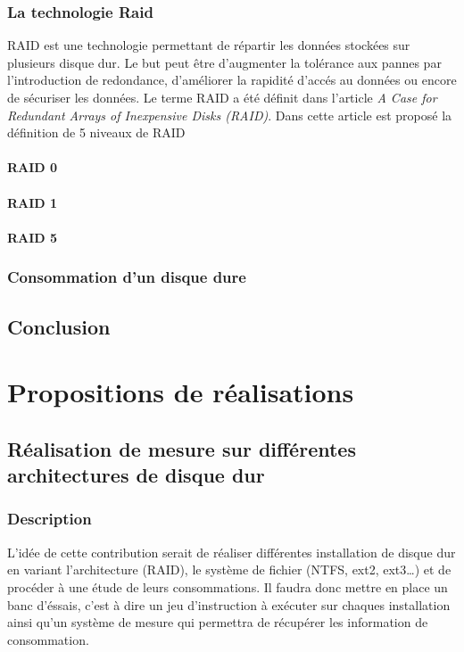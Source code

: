 \documentclass[a4paper, 11pt]{report}
\begin{document}
		\subsection{La technologie Raid}
RAID est une technologie permettant de répartir les données stockées sur plusieurs disque dur. Le but peut être d'augmenter la tolérance aux pannes par l'introduction de redondance, d'améliorer la rapidité d'accés au données ou encore de sécuriser les données. Le terme RAID a été définit dans l'article \textit{A Case for Redundant Arrays of Inexpensive Disks (RAID)}\cite{Patterson:1988:CRA:50202.50214}. Dans cette article est proposé la définition de 5 niveaux de RAID
			\subsubsection{RAID 0}
			
			\subsubsection{RAID 1}
			
			\subsubsection{RAID 5}
		
		\subsection{Consommation d'un disque dure}
		
	\section{Conclusion}

\chapter{Propositions de réalisations}
	\section{Réalisation de mesure sur différentes architectures de disque dur}
		\subsection{Description}
L'idée de cette contribution serait de réaliser différentes installation de disque dur en variant l'architecture (RAID), le système de fichier (NTFS, ext2, ext3\ldots) et de procéder à une étude de leurs consommations. Il faudra donc mettre en place un banc d'éssais, c'est à dire un jeu d'instruction à exécuter sur chaques installation ainsi qu'un système de mesure qui permettra de récupérer les information de consommation.
\end{document}
